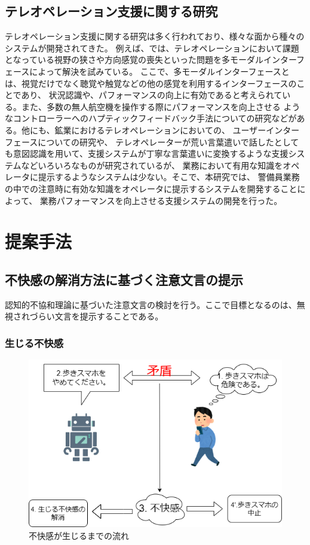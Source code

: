 \documentclass[11pt,a4j]{jreport}
\begin{document}
\section{テレオペレーション支援に関する研究}
テレオペレーション支援に関する研究は多く行われており、様々な面から種々のシステムが開発されてきた。
例えば、\cite{chen2007human,triantafyllidis2020study}では、テレオペレーションにおいて課題となっている視野の狭さや方向感覚の喪失といった問題を多モーダルインターフェースによって解決を試みている。
ここで、多モーダルインターフェースとは、視覚だけでなく聴覚や触覚などの他の感覚を利用するインターフェースのことであり、
状況認識や、パフォーマンスの向上に有効であると考えられている。また、多数の無人航空機を操作する際にパフォーマンスを向上させる
ようなコントローラーへのハプティックフィードバック手法についての研究\cite{son2011measuring}などがある。他にも、鉱業におけるテレオペレーションにおいての、
ユーザーインターフェースについての研究\cite{hainsworth2001teleoperation}や、
テレオペレーターが荒い言葉遣いで話したとしても意図認識を用いて、支援システムが丁寧な言葉遣いに変換するような支援システム\cite{Daneshmand2023}などいろいろなものが研究されているが、
業務において有用な知識をオペレータに提示するようなシステムは少ない。そこで、本研究では、
警備員業務の中での注意時に有効な知識をオペレータに提示するシステムを開発することによって、
業務パフォーマンスを向上させる支援システムの開発を行った。


\chapter{提案手法}
\section{不快感の解消方法に基づく注意文言の提示}
認知的不協和理論に基づいた注意文言の検討を行う。ここで目標となるのは、無視されづらい文言を提示することである。
\subsection{生じる不快感}
\label{sec: dissonance}
\begin{figure}[htbp]
  \label{fig: dissonance}
  \includegraphics[width=13cm]{img/CDT.png}
  \caption{不快感が生じるまでの流れ}
\end{figure}
\end{document}
